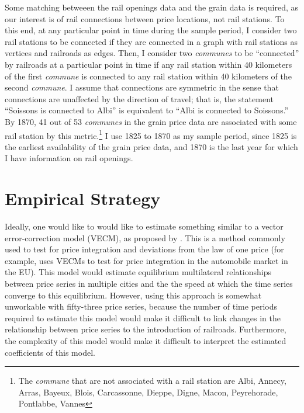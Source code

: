 \documentclass[12pt,twoside]{article}
\begin{document}
Some matching betweeen the rail openings data and the grain data is required, as our interest is of rail connections between price locations, not rail stations.
To this end, at any particular point in time during the sample period, I consider two rail stations to be connected if they are connected in a graph with rail stations as vertices and railroads as edges.
Then, I consider two \emph{communes} to be ``connected'' by railroads at a particular point in time if any rail station within 40 kilometers of the first \emph{commune} is connected to any rail station within 40 kilometers of the second \emph{commune}.
I assume that connections are symmetric in the sense that connections are unaffected by the direction of travel; that is, the statement ``Soissons is connected to Albi'' is equivalent to ``Albi is connected to Soissons.''
By 1870, 41 out of 53 \emph{communes} in the grain price data are associated with some rail station by this metric.\footnote{The \emph{commune} that are not associated with a rail station are Albi, Annecy, Arras, Bayeux, Blois, Carcassonne, Dieppe, Digne, Macon, Peyrehorade, Pontlabbe, Vannes}
I use 1825 to 1870 as my sample period, since 1825 is the earliest availability of the grain price data, and 1870 is the last year for which I have information on rail openings.
	
\section{Empirical Strategy}

Ideally, one would like to would like to estimate something similar to a vector error-correction model (VECM), as proposed by \cite{johansen}.
This is a method commonly used to test for price integration and deviations from the law of one price (for example, \cite{goldberg} uses VECMs to test for price integration in the automobile market in the EU).
This model would estimate equilibrium multilateral relationships between price series in multiple cities and the the speed at which the time series converge to this equilibrium.
However, using this approach is somewhat unworkable with fifty-three price series, because the number of time periods required to estimate this model would make it difficult to link changes in the relationship between price series to the introduction of railroads.
Furthermore, the complexity of this model would make it difficult to interpret the estimated coefficients of this model.
\end{document}
